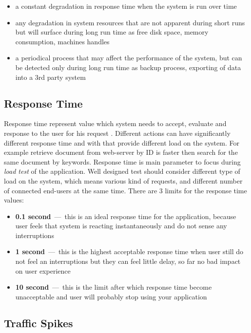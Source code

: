 \begin{itemize}
	\setlength\itemsep{0em}
	\item a constant degradation in response time when the system is run over time
	\item any degradation in system resources that are not apparent during short runs but will surface during long run time as free disk space, memory consumption, machines handles
	\item a periodical process that may affect the performance of the system, but can be detected only during long run time as backup process, exporting of data into a 3rd party system
\end{itemize}


\subsection{Response Time}
Response time represent value which system needs to accept, evaluate and response to the user for his request . Different actions can have significantly different response time and with that provide different load on the system. For example retrieve document from web-server by ID is faster then search for the same document by keywords. Response time is main parameter to focus during \emph{load test} of the application. Well designed test should consider different type of load on the system, which means various kind of requests, and different 
number of connected end-users at the same time. There are 3 limits for the response time values: 

\begin{itemize}
	\setlength\itemsep{0em}
	\item \textbf{0.1 second} \,---\ this is an ideal response time for the application, because user feels that system is reacting instantaneously and do not sense any interruptions
	\item \textbf{1 second} \,---\ this is the highest acceptable response time when user still do not feel an interruptions but they can feel little delay, so far no bad impact on user experience
	\item \textbf{10 second} \,---\ this is the limit after which response time become unacceptable and user will probably stop using your application
\end{itemize}

\subsection{Traffic Spikes}

